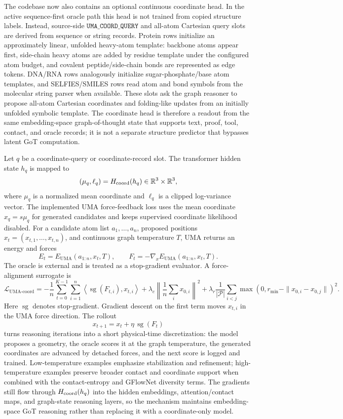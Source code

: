 \documentclass[11pt]{article}
\newcommand{\1}{\mathbf{1}}
\begin{document}
The codebase now also contains an optional continuous coordinate head. In the active sequence-first oracle path this head is not trained from copied structure labels. Instead, source-side \(\texttt{UMA\_COORD\_QUERY}\) and all-atom Cartesian query slots are derived from sequence or string records. Protein rows initialize an approximately linear, unfolded heavy-atom template: backbone atoms appear first, side-chain heavy atoms are added by residue template under the configured atom budget, and covalent peptide/side-chain bonds are represented as edge tokens. DNA/RNA rows analogously initialize sugar-phosphate/base atom templates, and SELFIES/SMILES rows read atom and bond symbols from the molecular string parser when available. These slots ask the graph reasoner to propose all-atom Cartesian coordinates and folding-like updates from an initially unfolded symbolic template. The coordinate head is therefore a readout from the same embedding-space graph-of-thought state that supports text, proof, tool, contact, and oracle records; it is not a separate structure predictor that bypasses latent GoT computation.

Let \(q\) be a coordinate-query or coordinate-record slot. The transformer hidden state \(h_q\) is mapped to
\[
  (\mu_q,\ell_q)=H_{\rm coord}(h_q)\in\mathbb R^3\times\mathbb R^3,
\]
where \(\mu_q\) is a normalized mean coordinate and \(\ell_q\) is a clipped log-variance vector. The implemented UMA force-feedback loss uses the mean coordinate \(x_q=s\mu_q\) for generated candidates and keeps supervised coordinate likelihood disabled. For a candidate atom list \(a_1,\ldots,a_n\), proposed positions \(x_t=(x_{t,1},\ldots,x_{t,n})\), and continuous graph temperature \(T\), UMA returns an energy and forces
\[
  E_t = E_{\mathrm{UMA}}(a_{1:n},x_t,T),
  \qquad
  F_t=-\nabla_x E_{\mathrm{UMA}}(a_{1:n},x_t,T).
\]
The oracle is external and is treated as a stop-gradient evaluator. A force-alignment surrogate is
\[
  \mathcal L_{\mathrm{UMA\mbox{-}coord}}
  =
  -\frac1n\sum_{t=0}^{K-1}\sum_{i=1}^n
  \left\langle \operatorname{sg}(F_{t,i}), x_{t,i}\right\rangle
  +\lambda_c\left\|\frac1n\sum_i x_{0,i}\right\|^2
  +\lambda_r\frac{1}{|\mathcal P|}\sum_{i<j}\max(0,r_{\min}-\|x_{0,i}-x_{0,j}\|)^2 .
\]
Here \(\operatorname{sg}\) denotes stop-gradient. Gradient descent on the first term moves \(x_{t,i}\) in the UMA force direction. The rollout
\[
  x_{t+1}=x_t+\eta\,\operatorname{sg}(F_t)
\]
turns reasoning iterations into a short physical-time discretization: the model proposes a geometry, the oracle scores it at the graph temperature, the generated coordinates are advanced by detached forces, and the next score is logged and trained. Low-temperature examples emphasize stabilization and refinement; high-temperature examples preserve broader contact and coordinate support when combined with the contact-entropy and GFlowNet diversity terms. The gradients still flow through \(H_{\rm coord}(h_q)\) into the hidden embeddings, attention/contact maps, and graph-state reasoning layers, so the mechanism maintains embedding-space GoT reasoning rather than replacing it with a coordinate-only model.
\end{document}
